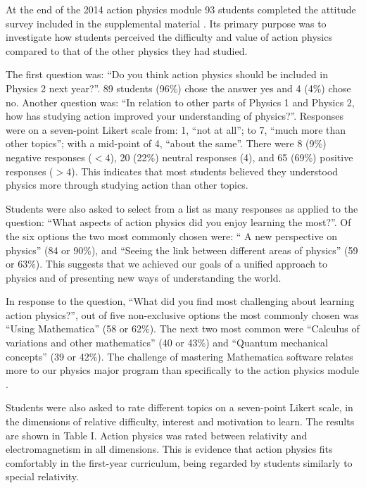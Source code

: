 \documentclass[prb,oncolumn,12pt]{revtex4-2}
\begin{document}
At the end of the 2014 action physics module 93 students completed the attitude survey included in the supplemental material \cite{supplement}.  Its primary purpose was to investigate how students perceived the difficulty and value of action physics compared to that of the other physics they had studied. 

The first question was: ``Do you think action physics should be included in Physics 2 next year?''. 89 students (96\%) chose the answer yes and 4 (4\%) chose no. Another question was: ``In relation to other parts of Physics 1 and Physics 2, how has studying action improved your understanding of physics?''. Responses were on a seven-point Likert scale from: 1, ``not at all''; to 7, ``much more than other topics''; with a mid-point of 4, ``about the same''. There were 8 (9\%) negative responses ($<4$), 20 (22\%) neutral responses (4), and 65 (69\%) positive responses ($>4$). This indicates that most students believed they understood physics more through studying action than other topics.

Students were also asked to select from a list as many responses as applied to the question: ``What aspects of action physics did you enjoy learning the most?''. Of the six options the two most commonly chosen were: `` A new perspective on physics'' (84 or 90\%), and ``Seeing the link between different areas of physics'' (59 or 63\%). This suggests that we achieved our goals of a unified approach to physics and of presenting new ways of understanding the world. 

In response to the question, ``What did you find most challenging about learning action physics?'', out of five non-exclusive options the most commonly chosen was ``Using Mathematica'' (58 or 62\%). The next two most common were ``Calculus of variations and other mathematics'' (40 or 43\%) and ``Quantum mechanical concepts'' (39 or 42\%). The challenge of mastering Mathematica software relates more to our physics major program than specifically to the action physics module \cite{Mathematica}. 

Students were also asked to rate different topics on a seven-point Likert scale, in the dimensions of relative difficulty, interest and motivation to learn. The results are shown in Table I. Action physics was rated between relativity and electromagnetism in all dimensions. This is evidence that action physics fits comfortably in the first-year curriculum, being regarded by students similarly to special relativity.
\end{document}
